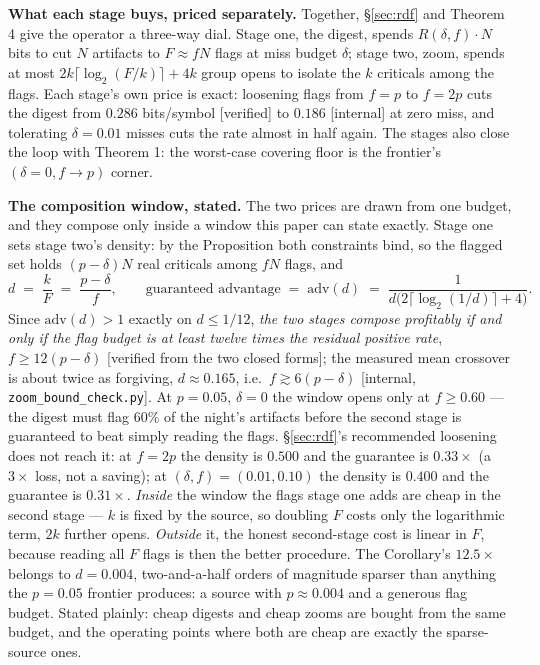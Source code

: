 \documentclass[11pt,a4paper]{article}
\begin{document}
\textbf{What each stage buys, priced separately.} Together, \S\ref{sec:rdf} and Theorem 4 give the operator a three-way dial. Stage one, the digest, spends $R(\delta,f)\cdot N$ bits to cut $N$ artifacts to $F\approx fN$ flags at miss budget $\delta$; stage two, zoom, spends at most $2k\lceil\log_2(F/k)\rceil+4k$ group opens to isolate the $k$ criticals among the flags. Each stage's own price is exact: loosening flags from $f{=}p$ to $f{=}2p$ cuts the digest from $0.286$ bits/symbol [verified] to $0.186$ [internal] at zero miss, and tolerating $\delta{=}0.01$ misses cuts the rate almost in half again. The stages also close the loop with Theorem 1: the worst-case covering floor is the frontier's $(\delta{=}0, f{\to}p)$ corner.

\textbf{The composition window, stated.} The two prices are drawn from one budget, and they compose only inside a window this paper can state exactly. Stage one sets stage two's density: by the Proposition both constraints bind, so the flagged set holds $(p-\delta)N$ real criticals among $fN$ flags, and
\[
d\;=\;\frac{k}{F}\;=\;\frac{p-\delta}{f},
\qquad\text{guaranteed advantage}\;=\;\mathrm{adv}(d)\;=\;\frac{1}{d\bigl(2\lceil\log_2(1/d)\rceil+4\bigr)} .
\]
Since $\mathrm{adv}(d)>1$ exactly on $d\le1/12$, \emph{the two stages compose profitably if and only if the flag budget is at least twelve times the residual positive rate}, $f\ge 12(p-\delta)$ [verified from the two closed forms]; the measured mean crossover is about twice as forgiving, $d\approx0.165$, i.e.\ $f\gtrsim6(p-\delta)$ [internal, \texttt{zoom\_bound\_check.py}]. At $p{=}0.05$, $\delta{=}0$ the window opens only at $f\ge0.60$ --- the digest must flag $60\%$ of the night's artifacts before the second stage is guaranteed to beat simply reading the flags. \S\ref{sec:rdf}'s recommended loosening does not reach it: at $f{=}2p$ the density is $0.500$ and the guarantee is $0.33\times$ (a $3\times$ loss, not a saving); at $(\delta,f)=(0.01,0.10)$ the density is $0.400$ and the guarantee is $0.31\times$. \emph{Inside} the window the flags stage one adds are cheap in the second stage --- $k$ is fixed by the source, so doubling $F$ costs only the logarithmic term, $2k$ further opens. \emph{Outside} it, the honest second-stage cost is linear in $F$, because reading all $F$ flags is then the better procedure. The Corollary's $12.5\times$ belongs to $d{=}0.004$, two-and-a-half orders of magnitude sparser than anything the $p{=}0.05$ frontier produces: a source with $p\approx0.004$ and a generous flag budget. Stated plainly: cheap digests and cheap zooms are bought from the same budget, and the operating points where both are cheap are exactly the sparse-source ones.
\end{document}
